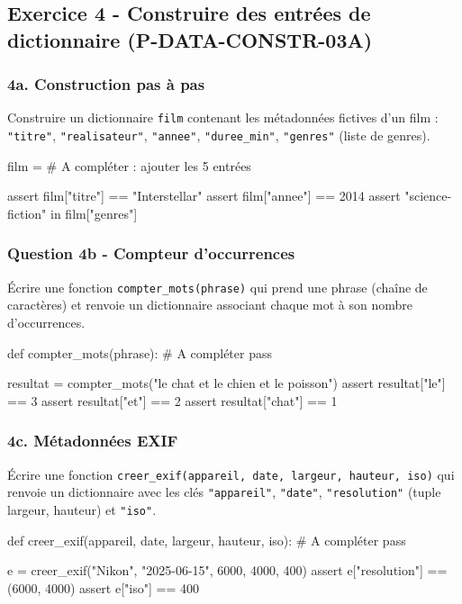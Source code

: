 \subsection{Exercice 4 - Construire des entrées de dictionnaire (P-DATA-CONSTR-03A)}

\subsubsection{4a. Construction pas à pas}

Construire un dictionnaire \texttt{film} contenant les métadonnées
fictives d'un film : \texttt{"titre"}, \texttt{"realisateur"},
\texttt{"annee"}, \texttt{"duree\_min"}, \texttt{"genres"} (liste de
genres).

\begin{python}
film = {}
# A compléter : ajouter les 5 entrées

assert film["titre"] == "Interstellar"
assert film["annee"] == 2014
assert "science-fiction" in film["genres"]
\end{python}

\subsubsection{Question 4b - Compteur d’occurrences}

Écrire une fonction \texttt{compter\_mots(phrase)} qui prend une phrase
(chaîne de caractères) et renvoie un dictionnaire associant chaque mot à
son nombre d'occurrences.

\begin{python}
def compter_mots(phrase):
    # A compléter
    pass

resultat = compter_mots("le chat et le chien et le poisson")
assert resultat["le"] == 3
assert resultat["et"] == 2
assert resultat["chat"] == 1
\end{python}

\subsubsection{4c. Métadonnées EXIF}

Écrire une fonction
\texttt{creer\_exif(appareil,\ date,\ largeur,\ hauteur,\ iso)} qui
renvoie un dictionnaire avec les clés \texttt{"appareil"},
\texttt{"date"}, \texttt{"resolution"} (tuple largeur, hauteur) et
\texttt{"iso"}.

\begin{python}
def creer_exif(appareil, date, largeur, hauteur, iso):
    # A compléter
    pass

e = creer_exif("Nikon", "2025-06-15", 6000, 4000, 400)
assert e["resolution"] == (6000, 4000)
assert e["iso"] == 400
\end{python}

